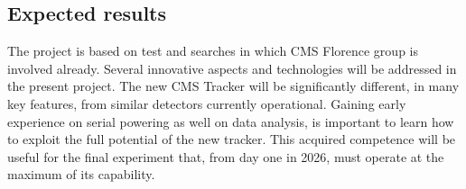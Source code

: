 \documentclass[a4paper,12pt,italian]{article}
\begin{document}
% 
%


\subsection*{Expected results}
The project is based on test and searches in which CMS Florence group is involved already. Several innovative aspects and technologies will be addressed in the present project. The new CMS Tracker will be significantly different, in many key features, from similar detectors currently operational. Gaining early experience on serial powering as well on data analysis, is important to learn how to exploit the full potential of the new tracker. This acquired competence will be useful for the final experiment that, from day one in 2026, must operate at the maximum of its capability.
\end{document}
